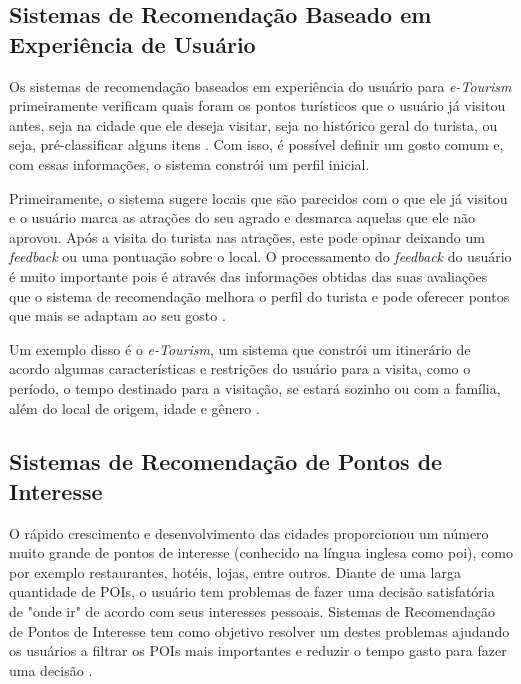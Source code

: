 \subsection{Sistemas de Recomendação Baseado em Experiência de Usuário}
\label{subsec:eTourism_recsys_userXP}

Os sistemas de recomendação baseados em experiência do usuário para \textit{e-Tourism} primeiramente verificam quais foram os pontos turísticos que o usuário já visitou antes, seja na cidade que ele deseja visitar, seja no histórico geral do turista, ou seja, pré-classificar alguns itens \citep{BORRAS20147370}. Com isso, é possível definir um gosto comum e, com essas informações, o sistema constrói um perfil inicial. 

Primeiramente, o sistema sugere locais que são parecidos com o que ele já visitou e o usuário marca as atrações do seu agrado e desmarca aquelas que ele não aprovou. Após a visita do turista nas atrações, este pode opinar deixando um \textit{feedback} ou uma pontuação sobre o local. O processamento do \textit{feedback} do usuário é muito importante pois é através das informações obtidas das suas avaliações que o sistema de recomendação melhora o perfil do turista e pode oferecer pontos que mais se adaptam ao seu gosto \citep{4669760}.

Um exemplo disso é o \textit{e-Tourism}, um sistema que constrói um itinerário de acordo algumas características e restrições do usuário para a visita, como o período, o tempo destinado para a visitação, se estará sozinho ou com a família, além do local de origem, idade e gênero \citep{4669760}.

\subsection{Sistemas de Recomendação de Pontos de Interesse}
\label{subsec:eTourism_recSys_poi}

O rápido crescimento e desenvolvimento das cidades proporcionou um número muito grande de pontos de interesse (conhecido na língua inglesa como \ac{poi}), como por exemplo restaurantes, hotéis, lojas, entre outros. Diante de uma larga quantidade de POIs, o usuário tem problemas de fazer uma decisão satisfatória de "onde ir" de acordo com seus interesses pessoais. Sistemas de Recomendação de Pontos de Interesse tem como objetivo resolver um destes problemas ajudando os usuários a filtrar os POIs mais importantes e reduzir o tempo gasto para fazer uma decisão \citep{AAAI159560}.

